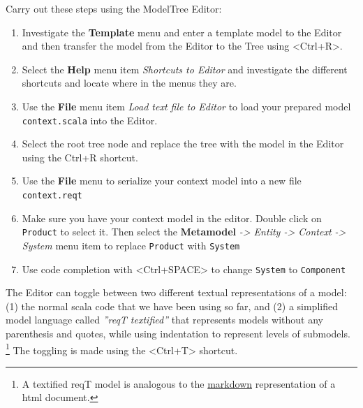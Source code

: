 \documentclass[11pt]{article}
\begin{document}
\begin{framed}
Carry out these steps using the ModelTree Editor:
\begin{enumerate}
\item Investigate the {\bf Template} menu and enter a template model to the Editor and then transfer the model from the Editor to the Tree using <Ctrl+R>.
\item Select the {\bf Help} menu item {\it Shortcuts to Editor} and investigate the different shortcuts and locate where in the menus they are. 
\item Use the {\bf File} menu item {\it Load text file to Editor} to load your prepared model \verb+context.scala+ into the Editor.
\item Select the root tree node and replace the tree with the model in the Editor using the Ctrl+R shortcut.
\item Use the {\bf File} menu to serialize your context model into a new file \verb+context.reqt+
\item Make sure you have your context model in the editor. Double click on \verb+Product+ to select it. Then select the {\bf Metamodel} {\it -> Entity -> Context -> System} menu item to replace \verb+Product+ with \verb+System+
\item Use code completion with <Ctrl+SPACE> to change \verb+System+ to \verb+Component+ 
\end{enumerate}
\end{framed}

The Editor can toggle between two different textual representations of a model: (1) the normal scala code that we have been using so far, and (2) a simplified model language called {\it ''reqT textified''} that represents models without any parenthesis and quotes, while using indentation to represent levels of submodels. \footnote{A textified reqT model is analogous to the \href{http://en.wikipedia.org/wiki/Markdown}{markdown} representation of a html document.} The toggling is made using the <Ctrl+T> shortcut.
\end{document}
